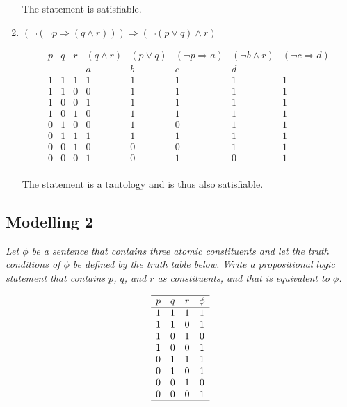 \begin{enumerate}[label=\alph*)]
        The statement is satisfiable. 
    \item $ (\neg (\neg p \Longrightarrow (q \land r))) \Longrightarrow (\neg (p \lor q) \land r) $ 
    
        \[
            \begin{array}{ccccccccc}  
                \hline
                p & q & r & (q \land r) & (p \lor q) & (\neg p \Longrightarrow a) & ( \neg b \land r) & (\neg c \Longrightarrow d) \\
                & & & a & b & c & d &  \\
                \hline
                1 & 1 & 1 & 1 & 1 & 1 & 1 & 1 \\
                1 & 1 & 0 & 0 & 1 & 1 & 1 & 1 \\
                1 & 0 & 0 & 1 & 1 & 1 & 1 & 1 \\
                1 & 0 & 1 & 0 & 1 & 1 & 1 & 1 \\
                0 & 1 & 0 & 0 & 1 & 0 & 1 & 1 \\
                0 & 1 & 1 & 1 & 1 & 1 & 1 & 1 \\
                0 & 0 & 1 & 0 & 0 & 0 & 1 & 1 \\
                0 & 0 & 0 & 1 & 0 & 1 & 0 & 1 \\
            \end{array}
        \]

        The statement is a tautology and is thus also satisfiable. 
\end{enumerate}

\subsection{Modelling 2}
\textit{Let $\phi$ be a sentence that contains three atomic constituents and let the truth conditions of $\phi$ be defined
by the truth table below. Write a propositional logic statement that contains $p$, $q$, and $r$ as constituents,
and that is equivalent to $\phi$.}

\[
\begin{array}{cccc}
    \hline 
    p & q & r & \phi \\
    \hline 
    1 & 1 & 1 & 1 \\
    1 & 1 & 0 & 1 \\
    1 & 0 & 1 & 0 \\
    1 & 0 & 0 & 1 \\
    0 & 1 & 1 & 1 \\
    0 & 1 & 0 & 1 \\
    0 & 0 & 1 & 0 \\
    0 & 0 & 0 & 1 \\
    \hline
\end{array}
\]

